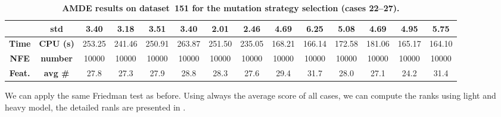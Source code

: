 \documentclass[12pt, openany]{article}
\begin{document}
\begin{table}[H]
{\begin{tabular}{|c | c | c c c c c c | c c c c c c |}
        & \textbf{std}   & 3.40 & 3.18 & 3.51 & 3.40 & 2.01 & 2.46 & 4.69 & 6.25 & 5.08 & 4.69 & 4.95 & 5.75 \\ \hline
        \textbf{Time} & \textbf{CPU (s)} & 253.25 & 241.46 & 250.91 & 263.87 & 251.50 & 235.05 & 168.21 & 166.14 & 172.58 & 181.06 & 165.17 & 164.10 \\ \hline
        \textbf{NFE} & \textbf{number} & 10000 & 10000 & 10000 & 10000 & 10000 & 10000 & 10000 & 10000 & 10000 & 10000 & 10000 & 10000 \\ \hline
        \textbf{Feat.} & \textbf{avg \#} & 27.8 & 27.3 & 27.9 & 28.8 & 28.3 & 27.6 & 29.4 & 31.7 & 28.0 & 27.1 & 24.2 & 31.4 \\ \hline
    \end{tabular}
    }
    \caption{\textbf{AMDE results on dataset~151 for the mutation strategy selection (cases 22--27).}}
    \label{tab:results_AMDE_strategy_d151}
\end{table}

We can apply the same Friedman test as before. Using always the average score of all cases, we can compute  the ranks using light and heavy model, the detailed ranls are presented in .
\end{document}

